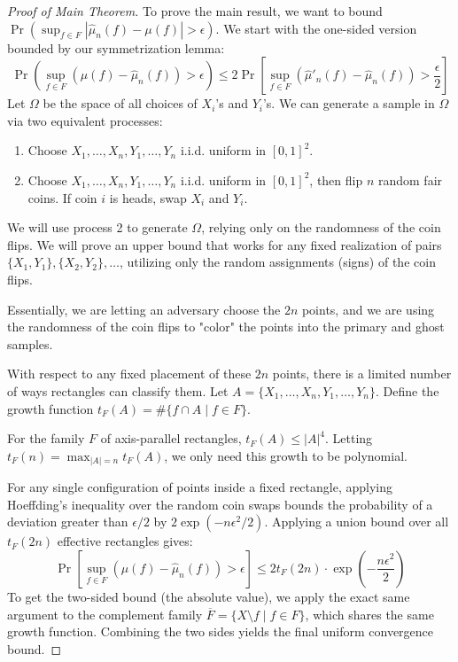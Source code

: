 \documentclass[a4paper]{article}
\begin{document}
\begin{proof}[Proof of Main Theorem]
    To prove the main result, we want to bound $\Pr\left( \sup_{f \in F} |\hat{\mu}_n(f) - \mu(f)| > \epsilon \right)$. We start with the one-sided version bounded by our symmetrization lemma:
    \[
        \Pr\left( \sup_{f \in F} (\mu(f) - \hat{\mu}_n(f)) > \epsilon \right) \leq 2 \Pr\left[ \sup_{f \in F} (\hat{\mu}'_n(f) - \hat{\mu}_n(f)) > \frac{\epsilon}{2} \right]
    \]
    Let $\Omega$ be the space of all choices of $X_i$'s and $Y_i$'s. We can generate a sample in $\Omega$ via two equivalent processes:
    \begin{enumerate}
        \item Choose $X_1, \dots, X_n, Y_1, \dots, Y_n$ i.i.d. uniform in $[0,1]^2$.
        \item Choose $X_1, \dots, X_n, Y_1, \dots, Y_n$ i.i.d. uniform in $[0,1]^2$, then flip $n$ random fair coins. If coin $i$ is heads, swap $X_i$ and $Y_i$.
    \end{enumerate}
    We will use process 2 to generate $\Omega$, relying only on the randomness of the coin flips. We will prove an upper bound that works for any fixed realization of pairs $\{X_1, Y_1\}, \{X_2, Y_2\}, \dots$, utilizing only the random assignments (signs) of the coin flips. 
    
    Essentially, we are letting an adversary choose the $2n$ points, and we are using the randomness of the coin flips to "color" the points into the primary and ghost samples. 
    
    With respect to any fixed placement of these $2n$ points, there is a limited number of ways rectangles can classify them. Let $A = \{X_1, \dots, X_n, Y_1, \dots, Y_n\}$. Define the growth function $t_F(A) = \#\{f \cap A \mid f \in F\}$. 
    
    For the family $F$ of axis-parallel rectangles, $t_F(A) \leq |A|^4$. Letting $t_F(n) = \max_{|A|=n} t_F(A)$, we only need this growth to be polynomial. 
    
    For any single configuration of points inside a fixed rectangle, applying Hoeffding's inequality over the random coin swaps bounds the probability of a deviation greater than $\epsilon/2$ by $2\exp(-n\epsilon^2/2)$. Applying a union bound over all $t_F(2n)$ effective rectangles gives:
    \[
        \Pr\left[ \sup_{f \in F} (\mu(f) - \hat{\mu}_n(f)) > \epsilon \right] \leq 2 t_F(2n) \cdot \exp\left(-\frac{n\epsilon^2}{2}\right)
    \]
    To get the two-sided bound (the absolute value), we apply the exact same argument to the complement family $\overline{F} = \{X \setminus f \mid f \in F\}$, which shares the same growth function. Combining the two sides yields the final uniform convergence bound.
\end{proof}
\newpage
\end{document}
